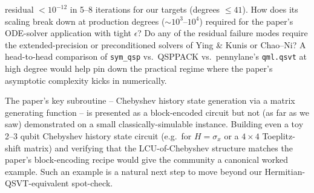 \begin{description}
        residual $<10^{-12}$ in 5--8 iterations for our targets
        (degrees $\le 41$).  How does its scaling break down at
        production degrees ($\sim 10^3$--$10^4$) required for the
        paper's ODE-solver application with tight $\epsilon$?  Do any
        of the residual failure modes require the extended-precision
        or preconditioned solvers of Ying \& Kunis or Chao--Ni?  A
        head-to-head comparison of \texttt{sym\_qsp} vs.\ QSPPACK vs.\
        pennylane's \texttt{qml.qsvt} at high degree would help pin
        down the practical regime where the paper's asymptotic
        complexity kicks in numerically.
  \item[Q5] The paper's key subroutine -- Chebyshev history state
        generation via a matrix generating function -- is presented as
        a block-encoded circuit but not (as far as we saw) demonstrated
        on a small classically-simulable instance.  Building even a
        toy 2--3 qubit Chebyshev history state circuit (e.g.\ for
        $H = \sigma_x$ or a $4\times4$ Toeplitz-shift matrix) and
        verifying that the LCU-of-Chebyshev structure matches the
        paper's block-encoding recipe would give the community a
        canonical worked example.  Such an example is a natural next
        step to move beyond our Hermitian-QSVT-equivalent spot-check.
\end{description}
